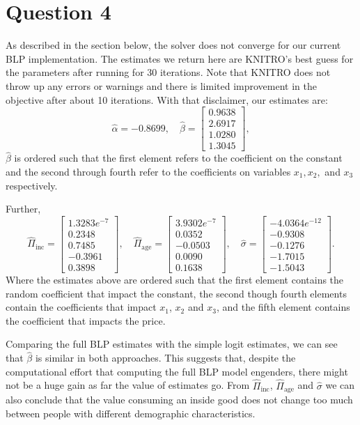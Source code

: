 \documentclass[a4paper,11pt]{article}
\begin{document}
\section*{Question 4}
As described in the section below, the solver does not converge for our current BLP implementation. The estimates we return here are KNITRO's best guess for the parameters after running for 30 iterations. Note that KNITRO does not throw up any errors or warnings and there is limited improvement in the objective after about 10 iterations. With that disclaimer, our estimates are:
\[
\hat\alpha = -0.8699, \quad
\hat\beta = \left[ \begin{array}{r} 
0.9638 \\ 2.6917 \\ 1.0280 \\ 1.3045
\end{array}\right],
\]
$\hat\beta$ is ordered such that the first element refers to the coefficient on the constant and the second through fourth refer to the coefficients on variables $x_1, x_2,$ and $x_3$ respectively.

\noindent Further,
\[
\hat\Pi_{\mathrm{inc}} = \left[ \begin{array}{r}
1.3283e^{-7} \\ 0.2348 \\ 0.7485 \\ -0.3961 \\ 0.3898
\end{array}\right],
\quad
\hat\Pi_{\mathrm{age}} = \left[ \begin{array}{r}
3.9302e^{-7} \\ 0.0352 \\ -0.0503 \\ 0.0090 \\ 0.1638
\end{array}\right],
\quad
\hat\sigma = \left[ \begin{array}{r}
-4.0364e^{-12} \\ -0.9308 \\ -0.1276 \\ -1.7015 \\ -1.5043
\end{array}\right].
\]
Where the estimates above are ordered such that the first element contains the random coefficient that impact the constant, the second though fourth elements contain the coefficients that impact $x_1$, $x_2$ and $x_3$, and the fifth element contains the coefficient that impacts the price.

Comparing the full BLP estimates with the simple logit estimates, we can see that $\hat\beta$ is similar in both approaches. This suggests that, despite the computational effort that computing the full BLP model engenders, there might not be a huge gain as far the value of estimates go. From $\hat\Pi_{\mathrm{inc}}$, $\hat\Pi_{\mathrm{age}}$ and $\hat\sigma$ we can also conclude that the value consuming an inside good does not change too much between people with different demographic characteristics. 
\end{document}
